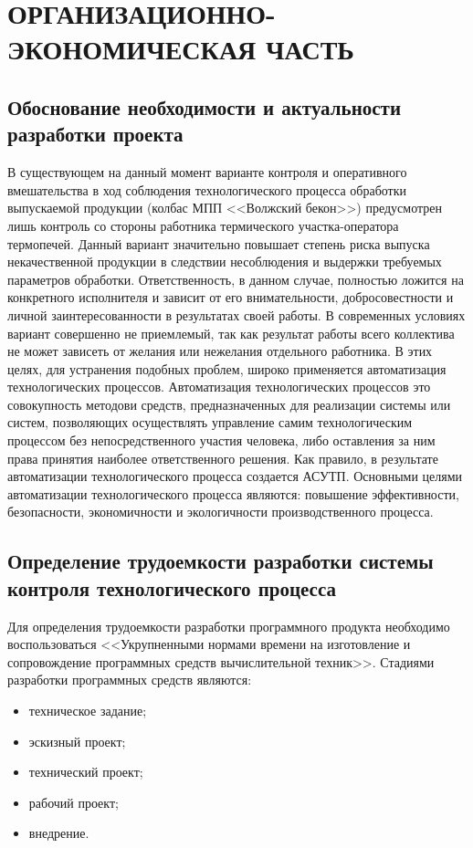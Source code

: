 \section{ОРГАНИЗАЦИОННО-ЭКОНОМИЧЕСКАЯ ЧАСТЬ}

\subsection{Обоснование необходимости и актуальности разработки проекта}
\begin{par}
В существующем на данный момент варианте контроля и оперативного
вмешательства в ход соблюдения технологического процесса обработки выпускаемой продукции (колбас
МПП <<Волжский бекон>>) предусмотрен лишь контроль со стороны работника термического
участка-оператора термопечей. Данный вариант значительно повышает степень риска выпуска некачественной
продукции в следствии несоблюдения и выдержки требуемых параметров обработки. Ответственность, в
данном случае, полностью ложится на конкретного исполнителя и зависит от его внимательности,
добросовестности и личной заинтересованности в результатах своей работы.
В современных условиях вариант совершенно не приемлемый, так как результат  работы всего
коллектива не может зависеть от желания или нежелания отдельного работника.
В этих целях, для устранения подобных проблем, широко применяется 
автоматизация технологических процессов. Автоматизация технологических процессов это
совокупность методови средств, предназначенных для реализации системы или систем, позволяющих
осуществлять управление самим технологическим процессом без непосредственного участия человека,
либо оставления за ним права принятия наиболее ответственного решения.
Как правило, в результате автоматизации технологического процесса создается АСУТП.
Основными целями автоматизации технологического процесса являются: повышение эффективности,
безопасности, экономичности и экологичности производственного процесса.
\end{par}

\subsection{Определение трудоемкости разработки системы контроля технологического процесса}
Для определения трудоемкости разработки программного продукта необходимо воспользоваться <<Укрупненными
нормами времени на изготовление и сопровождение программных средств вычислительной техник>>.
Стадиями разработки программных средств являются:
\begin{itemize}
    \item{} техническое задание;
    \item{} эскизный проект;
    \item{} технический проект;
    \item{} рабочий проект;
    \item{} внедрение.
\end{itemize}

